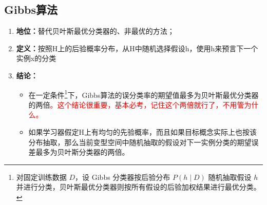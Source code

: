 \documentclass[../main.tex]{subfiles}
\begin{document}
\subsection{Gibbs算法}\label{sec:gibbs-algorithm}
\begin{enumerate}
    \item \textbf{地位：}替代贝叶斯最优分类器的、非最优的方法；
    \item \textbf{定义：}按照H上的后验概率分布，从H中随机选择假设h，使用h来预言下一个实例x的分类
    \item \textbf{结论：}
    \begin{itemize}
        \item 在一定条件\footnote{对固定训练数据 $D$，设 Gibbs 分类器按后验分布 $P(h\mid D)$ 随机抽取假设 $h$ 并进行分类，贝叶斯最优分类器则按所有假设的后验加权结果进行最优分类。}下，Gibbs算法的误分类率的期望值最多为贝叶斯最优分类器的两倍\textcolor{red}{。这个结论很重要，基本必考，记住这个两倍就行了，不用管为什么。}
        \item 如果学习器假定H上有均匀的先验概率，而且如果目标概念实际上也按该分布抽取，那么当前变型空间中随机抽取的假设对下一实例分类的期望误差最多为贝叶斯分类器的两倍。
    \end{itemize}
\end{enumerate}
\end{document}

